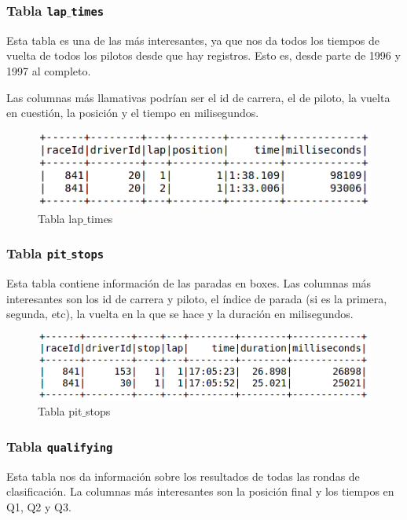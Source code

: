 \documentclass[12pt,twoside,titlepage]{report}
\begin{document}
\subsubsection{Tabla \texttt{lap$\_$times}}

Esta tabla es una de las más interesantes, ya que nos da todos los tiempos de vuelta de todos los pilotos desde que hay registros. Esto es, desde parte de 1996 y 1997 al completo.

Las columnas más llamativas podrían ser el id de carrera, el de piloto, la vuelta en cuestión, la posición y el tiempo en milisegundos. 

\begin{figure}[H]
  \includegraphics[scale=0.4]{lap_times_table.png}
  \centering
  \caption{Tabla lap$\_$times}
  \label{fig:laptimestab}
  \centering
\end{figure}

\subsubsection{Tabla \texttt{pit$\_$stops}}

Esta tabla contiene información de las paradas en boxes. Las columnas más interesantes son los id de carrera y piloto, el índice de parada (si es la primera, segunda, etc), la vuelta en la que se hace y la duración en milisegundos. 

\begin{figure}[H]
  \includegraphics[scale=0.5]{pit_stop_table.png}
  \centering
  \caption{Tabla pit$\_$stops}
  \label{fig:pitstops}
  \centering
\end{figure}

\subsubsection{Tabla \texttt{qualifying}}

Esta tabla nos da información sobre los resultados de todas las rondas de clasificación. La columnas más interesantes son la posición final y los tiempos en Q1, Q2 y Q3. 
\end{document}

